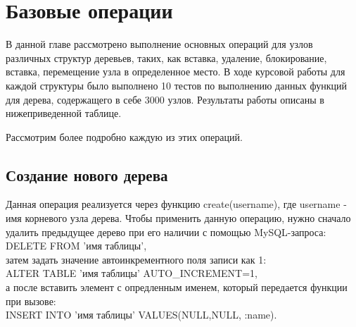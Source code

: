 \documentclass[a4paper,14pt]{extreport}
\theoremstyle{definition}
\begin{document}
\section{Базовые операции}
В данной главе рассмотрено выполнение основных операций для узлов различных структур деревьев, таких, как вставка, удаление, блокирование, вставка, перемещение узла в определенное место. В ходе курсовой работы для каждой структуры было выполнено 10 тестов по выполнению данных функций для дерева, содержащего в себе 3000 узлов. Результаты работы описаны в нижеприведенной таблице.
\begin{table}[H]
\end{table}
Рассмотрим более подробно каждую из этих операций.
\subsection{Создание нового дерева}
Данная операция реализуется через функцию create(\textdollar username), где \textdollar username - имя корневого узла дерева. Чтобы применить данную операцию, нужно сначало удалить предыдущее дерево при его наличии с помощью MySQL-запроса:\\
DELETE FROM 'имя таблицы', \\
затем задать значение автоинкрементного поля записи как 1: \\
ALTER TABLE 'имя таблицы' AUTO\_INCREMENT=1, \\
а после вставить элемент с опредленным именем, который передается функции при вызове:\\ INSERT INTO 'имя таблицы' VALUES(NULL,NULL, :name).
\end{document}
